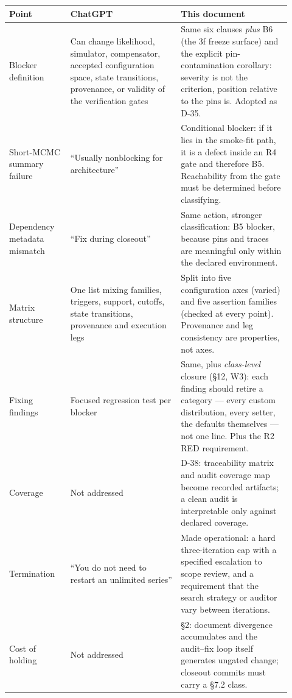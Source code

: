 \documentclass[11pt]{article}
\begin{document}
\begin{longtable}{@{}
  >{\raggedright\arraybackslash}p{0.20\linewidth}
  >{\raggedright\arraybackslash}p{0.36\linewidth}
  >{\raggedright\arraybackslash}p{0.36\linewidth}@{}}
\toprule
Point & ChatGPT & This document \\
\midrule
\endhead
Blocker definition & Can change likelihood, simulator, compensator, accepted configuration
space, state transitions, provenance, or validity of the verification gates & Same six
clauses \emph{plus} B6 (the 3f freeze surface) and the explicit pin-contamination
corollary: severity is not the criterion, position relative to the pins is. Adopted as
D-35. \\
\addlinespace[3pt]
Short-MCMC summary failure & ``Usually nonblocking for architecture'' & Conditional
blocker: if it lies in the smoke-fit path, it is a defect inside an R4 gate and therefore
B5. Reachability from the gate must be determined before classifying. \\
\addlinespace[3pt]
Dependency metadata mismatch & ``Fix during closeout'' & Same action, stronger
classification: B5 blocker, because pins and traces are meaningful only within the
declared environment. \\
\addlinespace[3pt]
Matrix structure & One list mixing families, triggers, support, cutoffs, state
transitions, provenance and execution legs & Split into five configuration axes (varied)
and five assertion families (checked at every point). Provenance and leg consistency are
properties, not axes. \\
\addlinespace[3pt]
Fixing findings & Focused regression test per blocker & Same, plus \emph{class-level}
closure (\S12, W3): each finding should retire a category --- every custom distribution,
every setter, the defaults themselves --- not one line. Plus the R2 RED requirement. \\
\addlinespace[3pt]
Coverage & Not addressed & D-38: traceability matrix and audit coverage map become
recorded artifacts; a clean audit is interpretable only against declared coverage. \\
\addlinespace[3pt]
Termination & ``You do not need to restart an unlimited series'' & Made operational: a
hard three-iteration cap with a specified escalation to scope review, and a requirement
that the search strategy or auditor vary between iterations. \\
\addlinespace[3pt]
Cost of holding & Not addressed & \S2: document divergence accumulates and the audit--fix
loop itself generates ungated change; closeout commits must carry a \S7.2 class. \\
\bottomrule
\end{longtable}
\end{document}
